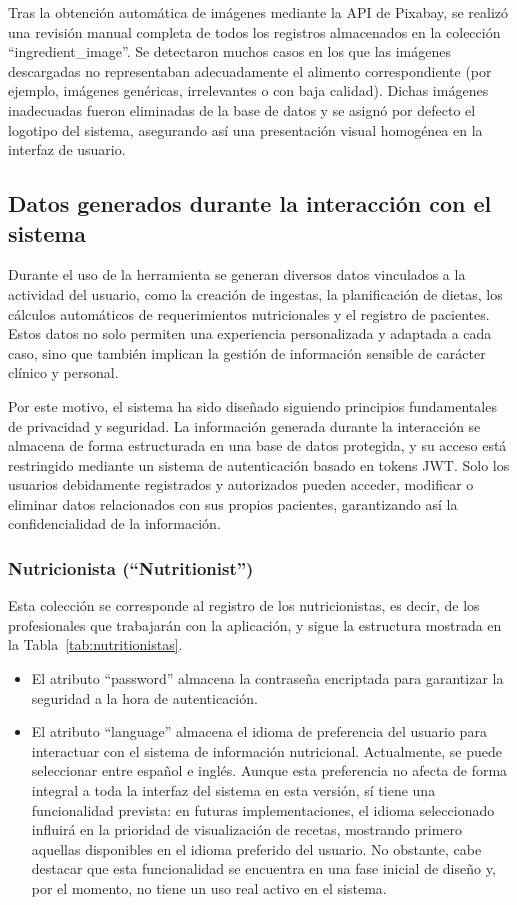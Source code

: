 Tras la obtención automática de imágenes mediante la API de Pixabay, se realizó una revisión manual completa de todos los registros almacenados en la colección ``ingredient\_image''. Se detectaron muchos casos en los que las imágenes descargadas no representaban adecuadamente el alimento correspondiente (por ejemplo, imágenes genéricas, irrelevantes o con baja calidad). Dichas imágenes inadecuadas fueron eliminadas de la base de datos y se asignó por defecto el logotipo del sistema, asegurando así una presentación visual homogénea en la interfaz de usuario.

\subsection{Datos generados durante la interacción con el sistema}
Durante el uso de la herramienta se generan diversos datos vinculados a la actividad del usuario, como la creación de ingestas, la planificación de dietas, los cálculos automáticos de requerimientos nutricionales y el registro de pacientes. Estos datos no solo permiten una experiencia personalizada y adaptada a cada caso, sino que también implican la gestión de información sensible de carácter clínico y personal.

Por este motivo, el sistema ha sido diseñado siguiendo principios fundamentales de privacidad y seguridad. La información generada durante la interacción se almacena de forma estructurada en una base de datos protegida, y su acceso está restringido mediante un sistema de autenticación basado en tokens JWT. Solo los usuarios debidamente registrados y autorizados pueden acceder, modificar o eliminar datos relacionados con sus propios pacientes, garantizando así la confidencialidad de la información.

\subsubsection{Nutricionista (``Nutritionist'')}
Esta colección se corresponde al registro de los nutricionistas, es decir, de los profesionales que trabajarán con la aplicación, y sigue la estructura mostrada en la Tabla~\ref{tab:nutritionistas}.

\begin{itemize}
\item El atributo ``password'' almacena la contraseña encriptada para garantizar la seguridad a la hora de autenticación.

\item El atributo ``language'' almacena el idioma de preferencia del usuario para interactuar con el sistema de información nutricional. Actualmente, se puede seleccionar entre español e inglés. Aunque esta preferencia no afecta de forma integral a toda la interfaz del sistema en esta versión, sí tiene una funcionalidad prevista: en futuras implementaciones, el idioma seleccionado influirá en la prioridad de visualización de recetas, mostrando primero aquellas disponibles en el idioma preferido del usuario. No obstante, cabe destacar que esta funcionalidad se encuentra en una fase inicial de diseño y, por el momento, no tiene un uso real activo en el sistema.
\end{itemize}

